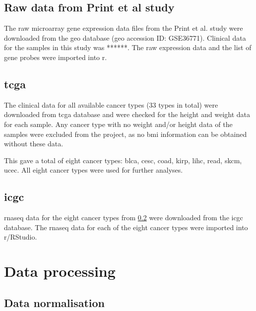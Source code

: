 \subsection{Raw data from Print et al study}
\label{subsec:printrawdat}


The raw microarray gene expression data files from the  Print et al. study were downloaded from the \gls{geo} database (\gls{geo} accession ID: GSE36771).
Clinical data for the samples in this study was ******.
The raw expression data and the list of gene probes were imported into \gls{r}.


\subsection{\gls{tcga}}
\label{subsec:tcga}

The clinical data for all available cancer types (33 types in total) were downloaded from \gls{tcga} database and were checked for the height and weight data for each sample.
Any cancer type with no weight and/or height data of the samples were excluded from the project, as no \gls{bmi} information can be obtained without these data.

This gave a total of eight cancer types: \gls{blca}, \gls{cesc}, \gls{coad}, \gls{kirp}, \gls{lihc}, \gls{read}, \gls{skcm}, \gls{ucec}.
All eight cancer types were used for further analyses.

\subsection{\gls{icgc}}
\label{subsec:icgc}

\gls{rnaseq} data for the eight cancer types from \cref{subsec:tcga} were downloaded from the \gls{icgc} database.
The \gls{rnaseq} data for each of the eight cancer types were imported into \gls{r}/RStudio.

\section{Data processing}
\label{sec:datproc}

\subsection{Data normalisation}
\label{sub:data_normalisation}

